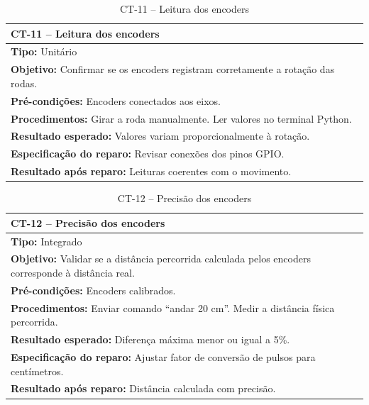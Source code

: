 
\begin{table}[H]
\centering
\begin{tabular}{|p{}|}
\hline
\textbf{CT-11 – Leitura dos encoders} \\ \hline
\textbf{Tipo:} Unitário \\ \hline
\textbf{Objetivo:} Confirmar se os encoders registram corretamente a rotação das rodas. \\ \hline
\textbf{Pré-condições:} Encoders conectados aos eixos. \\ \hline
\textbf{Procedimentos:} Girar a roda manualmente. Ler valores no terminal Python. \\ \hline
\textbf{Resultado esperado:} Valores variam proporcionalmente à rotação. \\ \hline
\textbf{Especificação do reparo:} Revisar conexões dos pinos GPIO. \\ \hline
\textbf{Resultado após reparo:} Leituras coerentes com o movimento. \\ \hline
\end{tabular}
\caption{CT-11 – Leitura dos encoders}
\end{table}


\begin{table}[H]
\centering
\begin{tabular}{|p{}|}
\hline
\textbf{CT-12 – Precisão dos encoders} \\ \hline
\textbf{Tipo:} Integrado \\ \hline
\textbf{Objetivo:} Validar se a distância percorrida calculada pelos encoders corresponde à distância real. \\ \hline
\textbf{Pré-condições:} Encoders calibrados. \\ \hline
\textbf{Procedimentos:} Enviar comando “andar 20 cm”. Medir a distância física percorrida. \\ \hline
\textbf{Resultado esperado:} Diferença máxima menor ou igual a 5\%. \\ \hline
\textbf{Especificação do reparo:} Ajustar fator de conversão de pulsos para centímetros. \\ \hline
\textbf{Resultado após reparo:} Distância calculada com precisão. \\ \hline
\end{tabular}
\caption{CT-12 – Precisão dos encoders}
\end{table}


